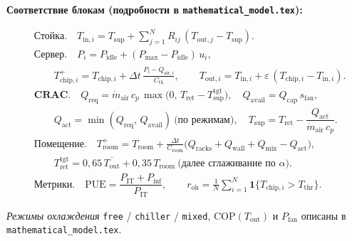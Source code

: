 \documentclass[12pt,a4paper,landscape]{article}
\begin{document}
\vspace{0.5em}

\noindent\textbf{Соответствие блокам (подробности в \texttt{mathematical\_model.tex}):}

\begin{align*}
  &\textbf{Стойка.}\quad
  T_{\mathrm{in},i} = T_{\mathrm{sup}} + \sum_{j=1}^{N} R_{ij}\,(T_{\mathrm{out},j} - T_{\mathrm{sup}}).
  \\[0.45em]
  &\textbf{Сервер.}\quad
  P_i = P_{\mathrm{idle}} + (P_{\mathrm{max}} - P_{\mathrm{idle}})\,u_i, \\[-0.1em]
  &\qquad T_{\mathrm{chip},i}^{+} = T_{\mathrm{chip},i} + \Delta t\,\frac{P_i - \dot Q_{\mathrm{air},i}}{C_{\mathrm{th}}}, \qquad
  T_{\mathrm{out},i} = T_{\mathrm{in},i} + \varepsilon\,(T_{\mathrm{chip},i} - T_{\mathrm{in},i}).
  \\[0.45em]
  &\textbf{CRAC.}\quad
  Q_{\mathrm{req}} = \dot m_{\mathrm{air}}\, c_p\, \max\bigl(0,\, T_{\mathrm{ret}} - T_{\mathrm{sup}}^{\mathrm{tgt}}\bigr), \quad
  Q_{\mathrm{avail}} = Q_{\mathrm{cap}}\, s_{\mathrm{fan}}, \\[-0.1em]
  &\qquad Q_{\mathrm{act}} = \min(Q_{\mathrm{req}},\, Q_{\mathrm{avail}})\ \text{(по режимам)}, \quad
  T_{\mathrm{sup}} = T_{\mathrm{ret}} - \dfrac{Q_{\mathrm{act}}}{\dot m_{\mathrm{air}}\, c_p}.
  \\[0.45em]
  &\textbf{Помещение.}\quad
  T_{\mathrm{room}}^{+} = T_{\mathrm{room}} + \frac{\Delta t}{C_{\mathrm{room}}}\bigl(Q_{\mathrm{racks}} + Q_{\mathrm{wall}} + Q_{\mathrm{mix}} - Q_{\mathrm{act}}\bigr), \\[-0.1em]
  &\qquad T_{\mathrm{ret}}^{\mathrm{tgt}} = 0{,}65\,\overline{T_{\mathrm{out}}} + 0{,}35\,T_{\mathrm{room}}
  \ \text{(далее сглаживание по $\alpha$).}
  \\[0.45em]
  &\textbf{Метрики.}\quad
  \mathrm{PUE} = \dfrac{P_{\mathrm{IT}} + P_{\mathrm{inf}}}{P_{\mathrm{IT}}}, \qquad
  r_{\mathrm{oh}} = \frac{1}{N}\sum_{i=1}^{N} \mathbf{1}\{T_{\mathrm{chip},i} > T_{\mathrm{thr}}\}.
\end{align*}

\vspace{0.3em}
\noindent\textit{Режимы охлаждения} \texttt{free} / \texttt{chiller} / \texttt{mixed}, COP$(T_{\mathrm{out}})$ и $P_{\mathrm{fan}}$ описаны в \texttt{mathematical\_model.tex}.
\end{document}

